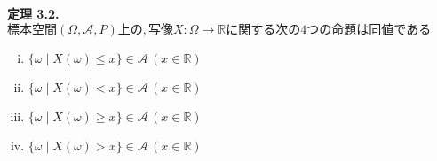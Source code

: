 \documentclass[dvipdfmx,10pt, a4j]{jarticle}
\theoremstyle{definition}
\begin{document}
    \newpage
    \noindent
    \textbf{定理 3.2.} $標本空間 (\Omega, \mathcal{A}, P)上の, 写像X : \Omega \rightarrow \mathbb{R} に関する次の4つの命題は同値である$
    \begin{enumerate}[i)]
        \item $\{\omega \mid X(\omega) \leq x\} \in \mathcal{A}\, (x \in \mathbb{R})$
        \item $\{\omega \mid X(\omega) < x\} \in \mathcal{A}\, (x \in \mathbb{R})$
        \item $\{\omega \mid X(\omega) \geq x\} \in \mathcal{A}\, (x \in \mathbb{R})$
        \item $\{\omega \mid X(\omega) > x\} \in \mathcal{A}\, (x \in \mathbb{R})$
    \end{enumerate}
\end{document}
